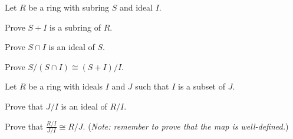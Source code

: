 \begin{problem}\label{problem-ring-isomorphism-2}
    Let $R$ be a ring with subring $S$ and ideal $I$.
    \begin{partquestions}{\roman*}
        \item Prove $S+I$ is a subring of $R$.
        \item Prove $S \cap I$ is an ideal of $S$.
        \item Prove $S/(S\cap I)\cong (S+I)/I$.
    \end{partquestions}
\end{problem}

\newpage

\begin{problem}\label{problem-ring-isomorphism-3}
    Let $R$ be a ring with ideals $I$ and $J$ such that $I$ is a subset of $J$.
    \begin{partquestions}{\roman*}
        \item Prove that $J/I$ is an ideal of $R/I$.
        \item Prove that $\frac{R/I}{J/I} \cong R/J$.\newline
        (\textit{Note: remember to prove that the map is well-defined.})
    \end{partquestions}
\end{problem}
